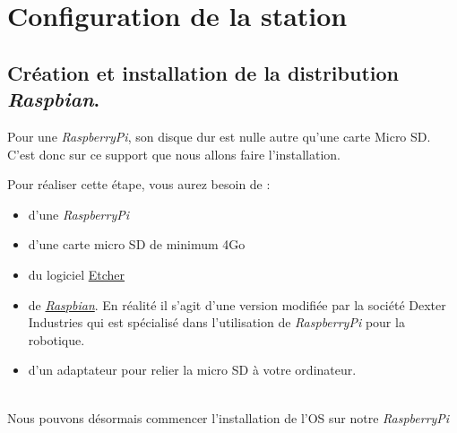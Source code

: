 \chapter{Configuration de la station}

\section{Création et installation de la distribution \textit{Raspbian}.}

Pour une \textit{RaspberryPi}, son disque dur est nulle autre qu'une carte Micro SD. C'est donc sur ce support que nous allons faire l'installation.

Pour réaliser cette étape, vous aurez besoin de :
\begin{itemize}
	\item d'une \textit{RaspberryPi}
	\item d'une carte micro SD de minimum 4Go
	\item du logiciel \href{etcher.io}{Etcher}
	\item de \href{https://sourceforge.net/projects/dexterindustriesraspbianflavor/}{\textit{Raspbian}}. En réalité il s'agit d'une version modifiée par la société Dexter Industries qui est spécialisé dans l'utilisation de \textit{RaspberryPi} pour la robotique.
	\item d'un adaptateur pour relier la micro SD à votre ordinateur.
\end{itemize}\\
Nous pouvons désormais commencer l'installation de l'OS sur notre \textit{RaspberryPi}

